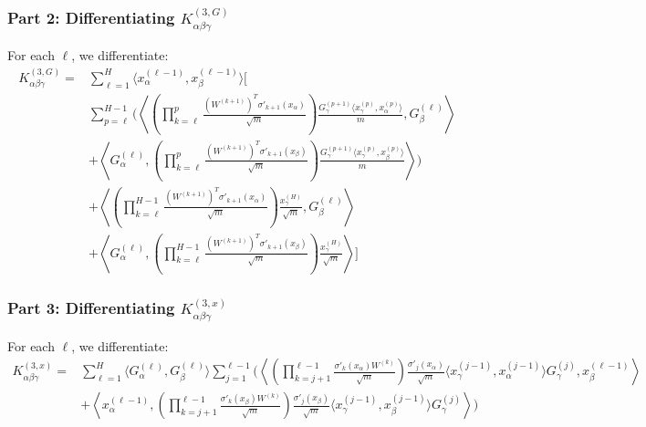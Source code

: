 \documentclass[11pt,a4paper]{article}
\theoremstyle{definition}
\begin{document}
\subsubsection{Part 2: Differentiating $K^{(3, G)}_{\alpha\beta\gamma}$}
For each $\ell$, we differentiate:
\begin{align}
K^{(3,G)}_{\alpha\beta\gamma} = & \sum_{\ell=1}^{H} \langle x^{(\ell-1)}_\alpha, x^{(\ell-1)}_\beta \rangle \Biggl[ \nonumber \\
& \sum_{p=\ell}^{H-1} \Biggl( \left\langle \left( \prod_{k=\ell}^{p} \frac{(W^{(k+1)})^T \sigma'_{k+1}(x_\alpha)}{\sqrt{m}} \right) \frac{G^{(p+1)}_\gamma \langle x^{(p)}_\gamma, x^{(p)}_\alpha \rangle}{m}, G^{(\ell)}_\beta \right\rangle \nonumber \\
& + \left\langle G^{(\ell)}_\alpha, \left( \prod_{k=\ell}^{p} \frac{(W^{(k+1)})^T \sigma'_{k+1}(x_\beta)}{\sqrt{m}} \right) \frac{G^{(p+1)}_\gamma \langle x^{(p)}_\gamma, x^{(p)}_\beta \rangle}{m} \right\rangle \Biggr) \nonumber \\
& + \left\langle \left( \prod_{k=\ell}^{H-1} \frac{(W^{(k+1)})^T \sigma'_{k+1}(x_\alpha)}{\sqrt{m}} \right) \frac{x^{(H)}_\gamma}{\sqrt{m}}, G^{(\ell)}_\beta \right\rangle \nonumber \\
& + \left\langle G^{(\ell)}_\alpha, \left( \prod_{k=\ell}^{H-1} \frac{(W^{(k+1)})^T \sigma'_{k+1}(x_\beta)}{\sqrt{m}} \right) \frac{x^{(H)}_\gamma}{\sqrt{m}} \right\rangle \Biggr]
\end{align}

\subsubsection{Part 3: Differentiating $K^{(3, x)}_{\alpha\beta\gamma}$}
For each $\ell$, we differentiate:
\begin{align}
K^{(3,x)}_{\alpha\beta\gamma} = & \sum_{\ell=1}^{H} \langle G^{(\ell)}_\alpha, G^{(\ell)}_\beta \rangle \sum_{j=1}^{\ell-1} \Biggl( \left\langle \left( \prod_{k=j+1}^{\ell-1} \frac{\sigma'_{k}(x_\alpha) W^{(k)}}{\sqrt{m}} \right) \frac{\sigma'_{j}(x_\alpha)}{\sqrt{m}} \langle x^{(j-1)}_\gamma, x^{(j-1)}_\alpha \rangle G^{(j)}_\gamma, x^{(\ell-1)}_\beta \right\rangle \nonumber \\
& + \left\langle x^{(\ell-1)}_\alpha, \left( \prod_{k=j+1}^{\ell-1} \frac{\sigma'_{k}(x_\beta) W^{(k)}}{\sqrt{m}} \right) \frac{\sigma'_{j}(x_\beta)}{\sqrt{m}} \langle x^{(j-1)}_\gamma, x^{(j-1)}_\beta \rangle G^{(j)}_\gamma \right\rangle \Biggr)
\end{align}
\end{document}
